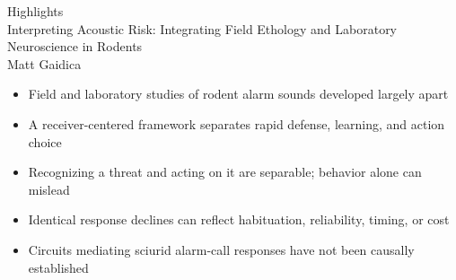 \documentclass[12pt,letterpaper]{article}
\begin{document}
\begin{center}
{\LARGE Highlights}\\[0.6em]
{\large Interpreting Acoustic Risk: Integrating Field Ethology and Laboratory Neuroscience in Rodents}\\[0.35em]
{\normalsize Matt Gaidica}
\end{center}
\vspace{1.25em}
\begin{itemize}
  \item Field and laboratory studies of rodent alarm sounds developed largely apart
  \item A receiver-centered framework separates rapid defense, learning, and action choice
  \item Recognizing a threat and acting on it are separable; behavior alone can mislead
  \item Identical response declines can reflect habituation, reliability, timing, or cost
  \item Circuits mediating sciurid alarm-call responses have not been causally established
\end{itemize}
\end{document}

